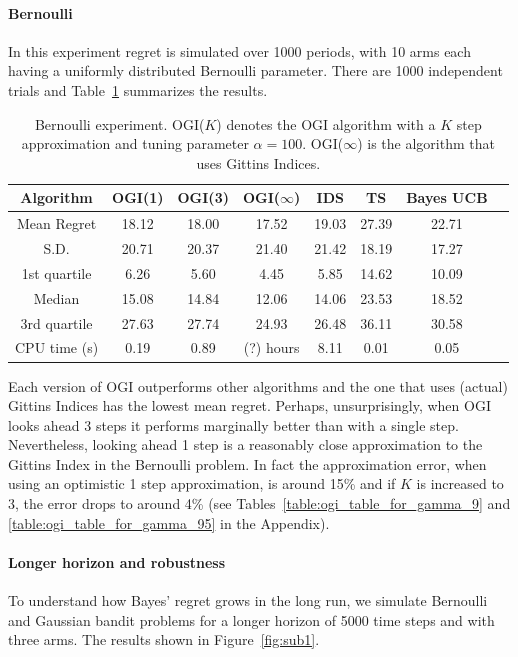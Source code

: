 \paragraph{Bernoulli}
In this experiment regret is simulated over 1000 periods, with 10 arms each having a uniformly distributed Bernoulli parameter. There are 1000 independent trials and Table~\ref{table:bernoulli_experiment1} summarizes the results.

\begin{table}[h!]
	\centering
	\begin{tabular}{| c| c | c | c | c | c | c | c |} \hline
		\textbf{Algorithm} & \textbf{OGI(1)} & \textbf{OGI(3)} &  \textbf{OGI($\infty$)} & \textbf{IDS} & \textbf{TS} & \textbf{Bayes UCB}  \\ \hline
		Mean Regret &  18.12 & 18.00 & 17.52 & 19.03 & 27.39 & 22.71 \\ \hline
		S.D. & 20.71 & 20.37 &  21.40 & 21.42 & 18.19 & 17.27 \\ \hline
		1st quartile & 6.26 & 5.60 & 4.45 & 5.85 & 14.62 & 10.09 \\ \hline
		Median & 15.08 & 14.84 &12.06 & 14.06 & 23.53 & 18.52 \\ \hline
		3rd quartile & 27.63 & 27.74 & 24.93 & 26.48 & 36.11 & 30.58 \\ \hline
		CPU time (s) & 0.19 & 0.89 & (?) hours & 8.11 & 0.01 & 0.05  \\ \hline
	\end{tabular}
	\caption[Table caption text]{Bernoulli experiment. OGI($K$) denotes the OGI algorithm with a $K$ step approximation and tuning parameter $\alpha = 100$. OGI($\infty$) is the algorithm that uses Gittins Indices.}
	\label{table:bernoulli_experiment1}
\end{table}
Each version of OGI outperforms other algorithms and the one that uses (actual) Gittins Indices has the lowest mean regret. Perhaps, unsurprisingly, when OGI  looks ahead 3 steps it performs marginally better than with a single step. Nevertheless, looking ahead 1 step is a reasonably close approximation to the Gittins Index in the Bernoulli problem. In fact the approximation error, when using an optimistic 1 step approximation, is around 15\% and if $K$ is increased to 3, the error drops to around 4\% (see Tables~\ref{table:ogi_table_for_gamma_9} and \ref{table:ogi_table_for_gamma_95} in the Appendix).


\paragraph{Longer horizon and robustness}
To understand how Bayes' regret grows in the long run, we simulate Bernoulli and Gaussian bandit problems for a longer horizon of 5000 time steps and with three arms. The results shown in Figure~\ref{fig:sub1}.

